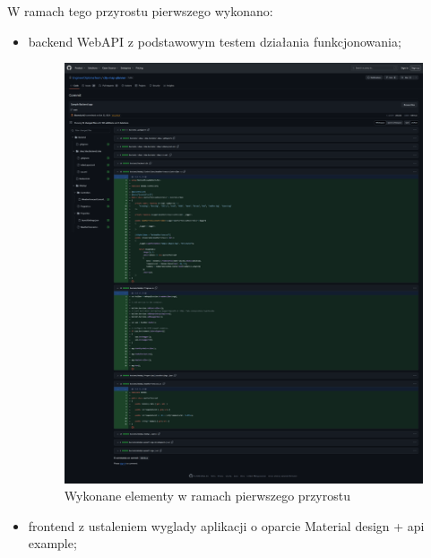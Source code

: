 W ramach tego przyrostu pierwszego wykonano:
\begin{itemize}
    \item backend WebAPI z podstawowym testem działania funkcjonowania;
    \begin{figure}[H]
        \centering
        \includegraphics[width=1\textwidth]{attachments/1}
        \caption{Wykonane elementy w ramach pierwszego przyrostu}
        \label{fig:figure1}
        \end{figure}
    \item frontend z ustaleniem wyglady aplikacji o oparcie Material design + api example;
    \begin{figure}[H]
        \centering

\end{figure}
\end{itemize}
